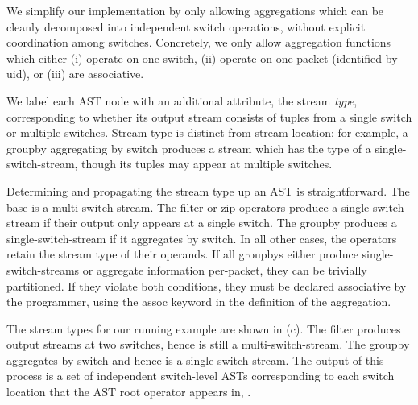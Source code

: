 We simplify our implementation by only allowing aggregations which can be
cleanly decomposed into independent switch operations, without explicit
coordination among switches.
Concretely, we only allow aggregation functions which either (i) operate on one
switch, (ii) operate on one packet (identified by {\ct uid}), or (iii)
are associative.

We label each AST node with an additional attribute, the stream {\em type},
corresponding to whether its output stream consists of tuples from a single
switch or multiple switches. Stream type is distinct from stream location: for
example, a {\ct groupby} aggregating by {\ct switch} produces a stream which has
the type of a single-switch-stream, though its tuples may appear at multiple
switches.

Determining and propagating the stream type up an AST is straightforward. The
base {\ct \pktlog} is a multi-switch-stream. The {\ct filter} or {\ct zip}
operators produce a single-switch-stream if their output only appears at a
single switch. The {\ct groupby} produces a single-switch-stream if it
aggregates by {\ct switch.} In all other cases, the operators retain the stream
type of their operands. If all {\ct groupby}s either produce
single-switch-streams or aggregate information per-packet, they can be trivially
partitioned. If they violate both conditions, they must be declared associative
by the programmer, using the {\ct assoc} keyword in the definition of the
aggregation.

The stream types for our running example are shown in
(c). The {\ct filter} produces output streams at
two switches, hence is still a multi-switch-stream. The {\ct groupby} aggregates
by {\ct switch} and hence is a single-switch-stream. The output of this process
is a set of independent switch-level ASTs corresponding to each switch location
that the AST root operator appears in, .



